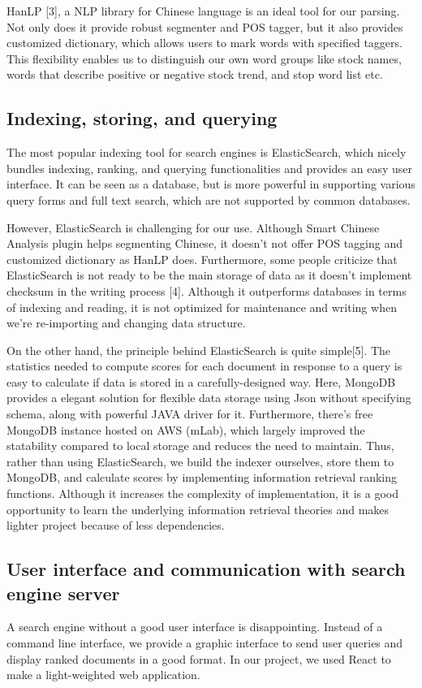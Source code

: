 \documentclass{article}
\begin{document}
HanLP [3], a NLP library for Chinese language is an ideal tool for our parsing. Not only does it provide robust segmenter and POS tagger, but it also provides customized dictionary, which allows users to mark words with specified taggers. This flexibility enables us to distinguish our own word groups like stock names, words that describe positive or negative stock trend, and stop word list etc.

\subsection{Indexing, storing, and querying}
The most popular indexing tool for search engines is ElasticSearch, which nicely bundles indexing, ranking, and querying functionalities and provides an easy user interface. It can be seen as a database, but is more powerful in supporting various query forms and full text search, which are not supported by common databases. 

However, ElasticSearch is challenging for our use. Although Smart Chinese Analysis plugin helps segmenting Chinese, it doesn't not offer POS tagging and customized dictionary as HanLP does. Furthermore, some people criticize that ElasticSearch is not ready to be the main storage of data as it doesn't implement checksum in the writing process [4]. Although it outperforms databases in terms of indexing and reading, it is not optimized for maintenance and writing when we're re-importing and changing data structure.

On the other hand, the principle behind ElasticSearch is quite simple[5]. The statistics needed to compute scores for each document in response to a query is easy to calculate if data is stored in a carefully-designed way. Here, MongoDB provides a elegant solution for flexible data storage using Json without specifying schema, along with powerful JAVA driver for it. Furthermore, there's free MongoDB instance hosted on AWS (mLab), which largely improved the statability compared to local storage and reduces the need to maintain. Thus, rather than using ElasticSearch, we build the indexer ourselves, store them to MongoDB, and calculate scores by implementing information retrieval ranking functions. Although it increases the complexity of implementation, it is a good opportunity to learn the underlying information retrieval theories and makes lighter project because of less dependencies.

\subsection{User interface and communication with search engine server}
A search engine without a good user interface is disappointing. Instead of a command line interface, we provide a graphic interface to send user queries and display ranked documents in a good format. In our project, we used React to make a light-weighted web application. 
\end{document}
